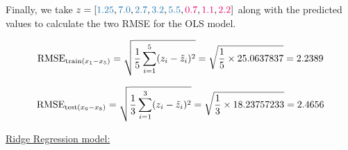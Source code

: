 \documentclass[12pt]{article}
\begin{document}
\begin{enumerate}
    Finally, we take $z = [\textcolor{codeblue}{1.25}, \textcolor{codeblue}{7.0}, \textcolor{codeblue}{2.7}, \textcolor{codeblue}{3.2}, \textcolor{codeblue}{5.5}, \textcolor{codepink}{0.7}, \textcolor{codepink}{1.1}, \textcolor{codepink}{2.2}]$ along with the predicted values to calculate the two RMSE for the OLS model.

    \begin{equation*}
        \text{RMSE}_{\text{train}(x_1\--x_5)} = \sqrt{\frac{1}{5} \sum_{i=1}^{5} (z_{i} - \tilde{z}_{i})^2} = \sqrt{\frac{1}{5} \times 25.0637837} = 2.2389
    \end{equation*}

    \begin{equation*}
        \text{RMSE}_{\text{test}(x_6\--x_8)} = \sqrt{\frac{1}{3} \sum_{i=1}^{3} (z_{i} - \tilde{z}_{i})^2} = \sqrt{\frac{1}{3} \times 18.23757233} = 2.4656
    \end{equation*}
    
    \vspace{10pt}
    \underline{Ridge Regression model:}


\end{enumerate}
\end{document}
